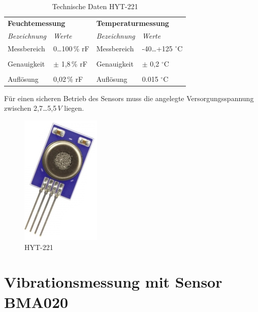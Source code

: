 \begin{table}[H]
\centering
\begin{tabular}{
llll
}
\toprule
\multicolumn{2}{p{7cm}}{\centering\textbf{Feuchtemessung}} & \multicolumn{2}{p{7cm}}{\centering\textbf{Temperaturmessung} } \\
\multicolumn{1}{p{4cm}}{\textit{Bezeichnung}} & \multicolumn{1}{p{3cm}}{\centering\textit{Werte} }&\multicolumn{1}{p{4cm}}{\textit{Bezeichnung}} & \multicolumn{1}{p{3cm}}{\centering\textit{Werte} }\\\midrule
Messbereich & 0\dots 100\,\% rF & Messbereich  & -40\dots +125 $^\circ\text{C}$ \\
&&&\\
Genauigkeit & $\pm$ 1,8\,\% rF& Genauigkeit & $\pm$ 0,2 $^\circ\text{C}$\\
&&&\\
Auflösung & 0,02\,\% rF & Auflösung & 0.015 $^\circ\text{C}$\\
\bottomrule
\end{tabular}
\caption{Technische Daten HYT-221 \citep{Datenblatt_HYT221}}
\label{Tabelle_Technische_Daten_HYT221}
\end{table}

Für einen sicheren Betrieb des Sensors muss die angelegte Versorgungsspannung zwischen 2,7\dots 5,5\,$V$ liegen.

\begin{figure}[!h] 
  \centering
     \includegraphics[scale=.8]{BilderAllgemein/HYT221.png}
  \caption{HYT-221 \citep{Bild_HYT221}}
  \label{Abb_HYT221}
\end{figure}




\section{Vibrationsmessung mit Sensor BMA020}
\label{section_BMA020}